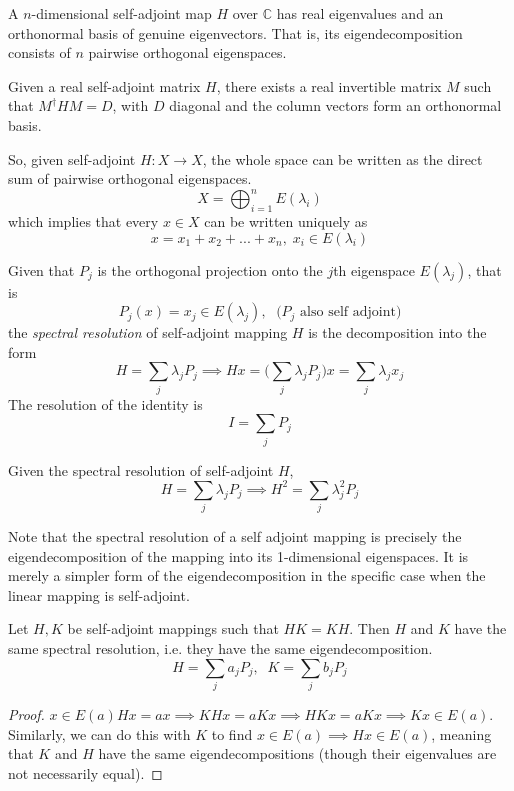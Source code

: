 \documentclass{article}
\begin{document}
    \begin{theorem}
    A $n$-dimensional self-adjoint map $H$ over $\mathbb{C}$ has real eigenvalues and an orthonormal basis of genuine eigenvectors. That is, its eigendecomposition consists of $n$ pairwise orthogonal eigenspaces. 
    \end{theorem}

    \begin{corollary}
    Given a real self-adjoint matrix $H$, there exists a real invertible matrix $M$ such that $M^\dagger H M = D$, with $D$ diagonal and the column vectors form an orthonormal basis.

    So, given self-adjoint $H: X \longrightarrow X$, the whole space can be written as the direct sum of pairwise orthogonal eigenspaces. 
    \[X = \bigoplus_{i=1}^n E(\lambda_i)\]
    which implies that every $x \in X$ can be written uniquely as 
    \[x = x_1 + x_2 + ... + x_n, \; x_i \in E(\lambda_i) \]
    \end{corollary}

    \begin{definition}
    Given that $P_j$ is the orthogonal projection onto the $j$th eigenspace $E(\lambda_j)$, that is
    \[P_j (x) = x_j \in E(\lambda_j), \; \text{ ($P_j$ also self adjoint)}\]
    the \textit{spectral resolution} of self-adjoint mapping $H$ is the decomposition into the form 
    \[H = \sum_j \lambda_j P_j \implies H x = \bigg( \sum_j \lambda_j P_j \bigg) x = \sum_j \lambda_j x_j\]
    The resolution of the identity is
    \[I = \sum_j P_j\]
    \end{definition}

    \begin{proposition}
    Given the spectral resolution of self-adjoint $H$, 
    \[H  = \sum_j \lambda_j P_j \implies H^2 = \sum_j \lambda_j^2 P_j\]
    \end{proposition}

    Note that the spectral resolution of a self adjoint mapping is precisely the eigendecomposition of the mapping into its 1-dimensional eigenspaces. It is merely a simpler form of the eigendecomposition in the specific case when the linear mapping is self-adjoint. 

    \begin{theorem}
    Let $H, K$ be self-adjoint mappings such that $H K = K H$. Then $H$ and $K$ have the same spectral resolution, i.e. they have the same eigendecomposition. 
    \[H = \sum_j a_j P_j, \; \; K = \sum_j b_j P_j\]
    \end{theorem}
    \begin{proof}
    $ x \in E(a) H x = a x \implies K H x = a K x \implies H K x = a K x \implies K x \in E(a)$. Similarly, we can do this with $K$ to find $x \in E(a) \implies H x \in E(a)$, meaning that $K$ and $H$ have the same eigendecompositions (though their eigenvalues are not necessarily equal). 
    \end{proof}
\end{document}
